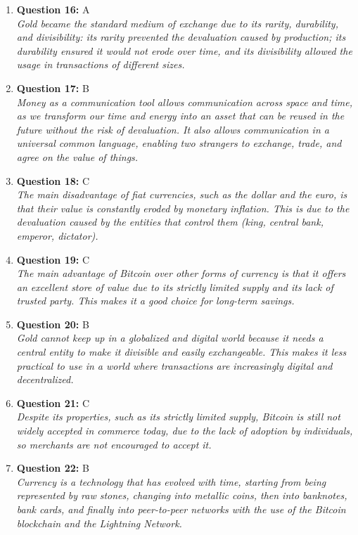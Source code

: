 \documentclass[12pt,a4paper]{article}
\begin{document}
\begin{enumerate}
\item \textbf{Question 16:} A
\\ \textit{Gold became the standard medium of exchange due to its rarity, durability, and divisibility: its rarity prevented the devaluation caused by production; its durability ensured it would not erode over time, and its divisibility allowed the usage in transactions of different sizes.}

\item \textbf{Question 17:} B
\\ \textit{Money as a communication tool allows communication across space and time, as we transform our time and energy into an asset that can be reused in the future without the risk of devaluation. It also allows communication in a universal common language, enabling two strangers to exchange, trade, and agree on the value of things.}

\item \textbf{Question 18:} C
\\ \textit{The main disadvantage of fiat currencies, such as the dollar and the euro, is that their value is constantly eroded by monetary inflation. This is due to the devaluation caused by the entities that control them (king, central bank, emperor, dictator).}

\item \textbf{Question 19:} C
\\ \textit{The main advantage of Bitcoin over other forms of currency is that it offers an excellent store of value due to its strictly limited supply and its lack of trusted party. This makes it a good choice for long-term savings.}

\item \textbf{Question 20:} B
\\ \textit{Gold cannot keep up in a globalized and digital world because it needs a central entity to make it divisible and easily exchangeable. This makes it less practical to use in a world where transactions are increasingly digital and decentralized.}

\item \textbf{Question 21:} C
\\ \textit{Despite its properties, such as its strictly limited supply, Bitcoin is still not widely accepted in commerce today, due to the lack of adoption by individuals, so merchants are not encouraged to accept it.}

\item \textbf{Question 22:} B
\\ \textit{Currency is a technology that has evolved with time, starting from being represented by raw stones, changing into metallic coins, then into banknotes, bank cards, and finally into peer-to-peer networks with the use of the Bitcoin blockchain and the Lightning Network.}


\end{enumerate}
\end{document}
